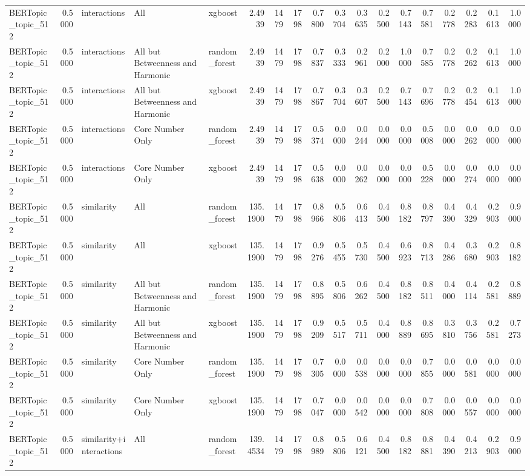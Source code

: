 \begin{tabular}{lrlllrrrrrrrrrrrrr}
BERTopic_topic_512 & 0.5000 & interactions & All & xgboost & 2.4939 & 1479 & 1798 & 0.7800 & 0.3704 & 0.3635 & 0.2500 & 0.7143 & 0.7581 & 0.2778 & 0.2283 & 0.1613 & 1.0000 \\
BERTopic_topic_512 & 0.5000 & interactions & All but Betweenness and Harmonic & random_forest & 2.4939 & 1479 & 1798 & 0.7837 & 0.3333 & 0.2961 & 0.2000 & 1.0000 & 0.7585 & 0.2778 & 0.2262 & 0.1613 & 1.0000 \\
BERTopic_topic_512 & 0.5000 & interactions & All but Betweenness and Harmonic & xgboost & 2.4939 & 1479 & 1798 & 0.7867 & 0.3704 & 0.3607 & 0.2500 & 0.7143 & 0.7696 & 0.2778 & 0.2454 & 0.1613 & 1.0000 \\
BERTopic_topic_512 & 0.5000 & interactions & Core Number Only & random_forest & 2.4939 & 1479 & 1798 & 0.5374 & 0.0000 & 0.0244 & 0.0000 & 0.0000 & 0.5008 & 0.0000 & 0.0262 & 0.0000 & 0.0000 \\
BERTopic_topic_512 & 0.5000 & interactions & Core Number Only & xgboost & 2.4939 & 1479 & 1798 & 0.5638 & 0.0000 & 0.0262 & 0.0000 & 0.0000 & 0.5228 & 0.0000 & 0.0274 & 0.0000 & 0.0000 \\
BERTopic_topic_512 & 0.5000 & similarity & All & random_forest & 135.1900 & 1479 & 1798 & 0.8966 & 0.5806 & 0.6413 & 0.4500 & 0.8182 & 0.8797 & 0.4390 & 0.4329 & 0.2903 & 0.9000 \\
BERTopic_topic_512 & 0.5000 & similarity & All & xgboost & 135.1900 & 1479 & 1798 & 0.9276 & 0.5455 & 0.5730 & 0.4500 & 0.6923 & 0.8713 & 0.4286 & 0.3680 & 0.2903 & 0.8182 \\
BERTopic_topic_512 & 0.5000 & similarity & All but Betweenness and Harmonic & random_forest & 135.1900 & 1479 & 1798 & 0.8895 & 0.5806 & 0.6262 & 0.4500 & 0.8182 & 0.8511 & 0.4000 & 0.4114 & 0.2581 & 0.8889 \\
BERTopic_topic_512 & 0.5000 & similarity & All but Betweenness and Harmonic & xgboost & 135.1900 & 1479 & 1798 & 0.9209 & 0.5517 & 0.5711 & 0.4000 & 0.8889 & 0.8695 & 0.3810 & 0.3756 & 0.2581 & 0.7273 \\
BERTopic_topic_512 & 0.5000 & similarity & Core Number Only & random_forest & 135.1900 & 1479 & 1798 & 0.7305 & 0.0000 & 0.0538 & 0.0000 & 0.0000 & 0.7855 & 0.0000 & 0.0581 & 0.0000 & 0.0000 \\
BERTopic_topic_512 & 0.5000 & similarity & Core Number Only & xgboost & 135.1900 & 1479 & 1798 & 0.7047 & 0.0000 & 0.0542 & 0.0000 & 0.0000 & 0.7808 & 0.0000 & 0.0557 & 0.0000 & 0.0000 \\
BERTopic_topic_512 & 0.5000 & similarity+interactions & All & random_forest & 139.4534 & 1479 & 1798 & 0.8989 & 0.5806 & 0.6121 & 0.4500 & 0.8182 & 0.8881 & 0.4390 & 0.4213 & 0.2903 & 0.9000 \\

\end{tabular}
